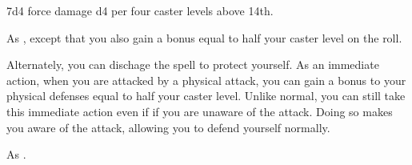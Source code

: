 \begin{spellheader}
\end{spellheader}
\begin{spellcontent}
    \begin{spelltargetinginfo}
    \end{spelltargetinginfo}
    \begin{spelleffects}
        \spelleffect 7d4 force damage \add d4 per four caster levels above 14th.
    \end{spelleffects}
\end{spellcontent}
\begin{spellfooter}

\end{spellfooter}

\begin{spellheader}
\end{spellheader}
\begin{spellcontent}
    \begin{spelltargetinginfo}
    \end{spelltargetinginfo}
    \begin{spelleffects}
        \spelleffect As , except that you also gain a bonus equal to half your caster level on the roll.

        Alternately, you can dischage the spell to protect yourself. As an immediate action, when you are attacked by a physical attack, you can gain a bonus to your physical defenses equal to half your caster level. Unlike normal, you can still take this immediate action even if if you are unaware of the attack. Doing so makes you aware of the attack, allowing you to defend yourself normally.
    \end{spelleffects}
\end{spellcontent}
\begin{spellfooter}
    \spellnotes As .
\end{spellfooter}

